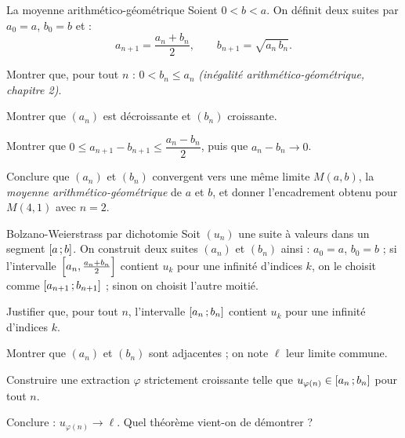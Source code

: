 \begin{exercice}[3]{La moyenne arithmético-géométrique}
Soient $0<b<a$. On définit deux suites par $a_0=a$, $b_0=b$ et :
\[
  a_{n+1}=\frac{a_n+b_n}{2},\qquad b_{n+1}=\sqrt{a_n\,b_n}.
\]
\begin{questions}
  \item Montrer que, pour tout $n$ : $0<b_n\leq a_n$
    \emph{(inégalité arithmético-géométrique, chapitre 2)}.
  \item Montrer que $(a_n)$ est décroissante et $(b_n)$ croissante.
  \item Montrer que $0\leq a_{n+1}-b_{n+1}\leq\dfrac{a_n-b_n}{2}$, puis que
    $a_n-b_n\to0$.
  \item Conclure que $(a_n)$ et $(b_n)$ convergent vers une même limite
    $M(a,b)$, la \emph{moyenne arithmético-géométrique} de $a$ et $b$, et
    donner l'encadrement obtenu pour $M(4,1)$ avec $n=2$.
\end{questions}
\end{exercice}

\begin{exercice}[3]{Bolzano-Weierstrass par dichotomie}
Soit $(u_n)$ une suite à valeurs dans un segment $\mathopen{[}a\,{;}\,b\mathclose{]}$. On
construit deux suites $(a_n)$ et $(b_n)$ ainsi : $a_0=a$, $b_0=b$ ; si
l'intervalle $\Bigl[a_n,\frac{a_n+b_n}{2}\Bigr]$ contient $u_k$ pour une
infinité d'indices $k$, on le choisit comme $\mathopen{[}a_{n+1}\,{;}\,b_{n+1}\mathclose{]}$ ;
sinon on choisit l'autre moitié.
\begin{questions}
  \item Justifier que, pour tout $n$, l'intervalle $\mathopen{[}a_n\,{;}\,b_n\mathclose{]}$
    contient $u_k$ pour une infinité d'indices $k$.
  \item Montrer que $(a_n)$ et $(b_n)$ sont adjacentes ; on note $\ell$ leur
    limite commune.
  \item Construire une extraction $\varphi$ strictement croissante telle que
    $u_{\varphi(n)}\in\mathopen{[}a_n\,{;}\,b_n\mathclose{]}$ pour tout $n$.
  \item Conclure : $u_{\varphi(n)}\to\ell$. Quel théorème vient-on de
    démontrer ?
\end{questions}
\end{exercice}


